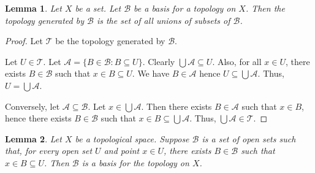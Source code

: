 \documentclass{book}
\newtheorem{lm}{Lemma}[chapter]
\theoremstyle{definition}
\begin{document}
  \begin{lm}
    \label{lm:topology_basis:unions_of_subsets}
    Let $X$ be a set. Let $\mathcal{B}$ be a basis for a topology on $X$. Then 
    the
    topology generated by $\mathcal{B}$ is the set of all unions of subsets of
    $\mathcal{B}$.
  \end{lm}
  
  \begin{proof}
    Let $\mathcal{T}$ be the topology generated by $\mathcal{B}$.
    
    Let $U \in \mathcal{T}$. Let $\mathcal{A} = \{ B \in \mathcal{B} : B 
    \subseteq
    U \}$. Clearly $\bigcup \mathcal{A} \subseteq U$. Also, for all $x \in U$,
    there exists $B \in \mathcal{B}$ such that $x \in B \subseteq U$. We have $B
    \in \mathcal{A}$ hence $U \subseteq \bigcup \mathcal{A}$. Thus, $U = \bigcup
    \mathcal{A}$.
    
    Conversely, let $\mathcal{A} \subseteq \mathcal{B}$. Let $x \in \bigcup
    \mathcal{A}$. Then there exists $B \in \mathcal{A}$ such that $x \in B$, 
    hence
    there exists $B \in \mathcal{B}$ such that $x \in B \subseteq \bigcup
    \mathcal{A}$. Thus, $\bigcup \mathcal{A} \in \mathcal{T}$.
  \end{proof}
  
  \begin{lm}
    \label{lm:topology:basis:criterion}
    Let $X$ be a topological space. Suppose $\mathcal{B}$ is a set of open sets 
    such that, for
    every open set $U$ and point $x \in U$, there exists $B \in \mathcal{B}$ 
    such 
    that $x \in B \subseteq U$.
    Then $\mathcal{B}$ is a basis for the topology on $X$.
  \end{lm}
  
\end{document}
